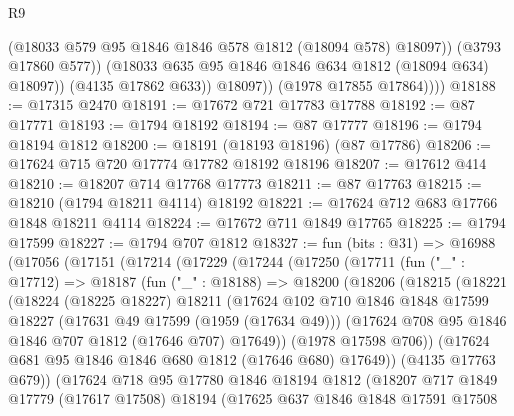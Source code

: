 \begin{lexlean}{R9}
\begin{coremodule}
                      (@18033 @579 @95 @1846 @1846 @578 @1812 (@18094 @578) @18097))
                    (@3793 @17860 @577))
                  (@18033 @635 @95 @1846 @1846 @634 @1812 (@18094 @634) @18097))
                (@4135 @17862 @633))
              @18097))
          (@1978 @17855 @17864))))
@18188 := @17315 @2470
@18191 := @17672 @721 @17783 @17788
@18192 := @87 @17771
@18193 := @1794 @18192
@18194 := @87 @17777
@18196 := @1794 @18194 @1812
@18200 := @18191 (@18193 @18196) (@87 @17786)
@18206 := @17624 @715 @720 @17774 @17782 @18192 @18196
@18207 := @17612 @414
@18210 := @18207 @714 @17768 @17773
@18211 := @87 @17763
@18215 := @18210 (@1794 @18211 @4114) @18192
@18221 := @17624 @712 @683 @17766 @1848 @18211 @4114
@18224 := @17672 @711 @1849 @17765
@18225 := @1794 @17599
@18227 := @1794 @707 @1812
@18327 := fun (bits : @31) =>
  @16988
    (@17056
      (@17151
        (@17214
          (@17229
            (@17244
              (@17250
                (@17711
                  (fun ("_" : @17712) =>
                  @18187
                    (fun ("_" : @18188) =>
                    @18200
                      (@18206
                        (@18215
                          (@18221
                            (@18224
                              (@18225 @18227)
                              @18211
                              (@17624
                                @102
                                @710
                                @1846
                                @1848
                                @17599
                                @18227
                                (@17631 @49 @17599 (@1959 (@17634 @49)))
                                (@17624 @708 @95 @1846 @1846 @707 @1812 (@17646 @707) @17649))
                              (@1978 @17598 @706))
                            (@17624 @681 @95 @1846 @1846 @680 @1812 (@17646 @680) @17649))
                          (@4135 @17763 @679))
                        (@17624
                          @718
                          @95
                          @17780
                          @1846
                          @18194
                          @1812
                          (@18207
                            @717
                            @1849
                            @17779
                            (@17617 @17508)
                            @18194
                            (@17625
                              @637
                              @1846
                              @1848
                              @17591
                              @17508

\end{coremodule}
\end{lexlean}
